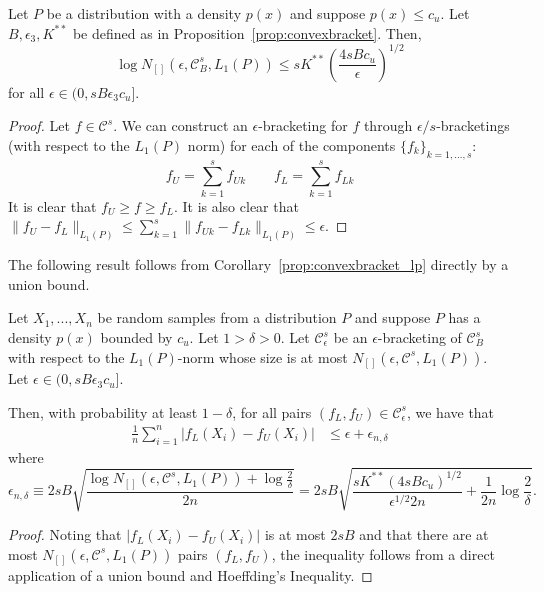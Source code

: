 \documentclass[12pt,pdftex,aos,noinfoline,addressasfootnote]{imsart}
\begin{document}
\begin{corollary}
\label{cor:convexadditive_lp}
Let $P$ be a distribution with a density $p(x)$ and suppose $p(x) \leq c_u$. Let $B, \epsilon_3, K^{**}$ be defined as in Proposition~\ref{prop:convexbracket}. Then,
\[
\log N_{[]}(\epsilon, \mathcal{C}^s_B, L_1(P)) \leq s K^{**} 
    \left( \frac{4sBc_u}{\epsilon} \right)^{1/2}
\]
for all $\epsilon \in (0, s B \epsilon_3c_u]$.
\end{corollary}

\begin{proof}
Let $f \in \mathcal{C}^s$. We can construct an $\epsilon$-bracketing for $f$ through $\epsilon/s$-bracketings (with respect to the $L_1(P)$ norm) for each of the components $\{ f_k \}_{k=1,...,s}$:
\[f_U = \sum_{k=1}^s f_{Uk}  \qquad f_L = \sum_{k=1}^s f_{Lk} \]
It is clear that $f_U \geq f \geq f_L$. It is also clear that $\| f_U - f_L \|_{L_1(P)} \leq \sum_{k=1}^s \| f_{Uk} - f_{Lk} \|_{L_1(P)} \leq \epsilon$.
\end{proof}


The following result follows from Corollary~\ref{prop:convexbracket_lp} directly by a union bound. 

\begin{corollary}
\label{cor:convexbracket_ln}
Let $X_1,...,X_n$ be random samples from a distribution $P$ and suppose $P$ has a density $p(x)$ bounded by $c_u$. Let $1 > \delta > 0$. Let $\mathcal{C}^s_\epsilon$ be an $\epsilon$-bracketing of $\mathcal{C}^s_B$ with respect to the $L_1(P)$-norm whose size is at most $N_{[]}(\epsilon, \mathcal{C}^s, L_1(P))$. Let $\epsilon \in (0, s B \epsilon_3c_u]$.

Then, with probability at least $1-\delta$, for all pairs $(f_L, f_U) \in \mathcal{C}^s_\epsilon$, we have that
\begin{align*}
\frac{1}{n} \sum_{i=1}^n |f_L(X_i) - f_U(X_i)| &\leq \epsilon + \epsilon_{n, \delta}
\end{align*}
where 
$$\epsilon_{n,\delta} \equiv 
2sB \sqrt{ \frac{ \log N_{[]}(\epsilon, \mathcal{C}^s, L_1(P)) + \log \frac{2}{\delta}}{2n}} 
= 2sB \sqrt{ \frac{ sK^{**}(4sBc_u)^{1/2}}{\epsilon^{1/2} 2n} + \frac{1}{2n} \log \frac{2}{\delta}}.$$
\end{corollary}

\begin{proof}
Noting that $|f_L(X_i) - f_U(X_i)|$ is at most $2sB$ and that there are at most 
$N_{[]}(\epsilon, \mathcal{C}^s, L_1(P))$ pairs $(f_L, f_U)$, the
inequality follows from a direct application of a union bound and Hoeffding's Inequality.
\end{proof}
\end{document}
